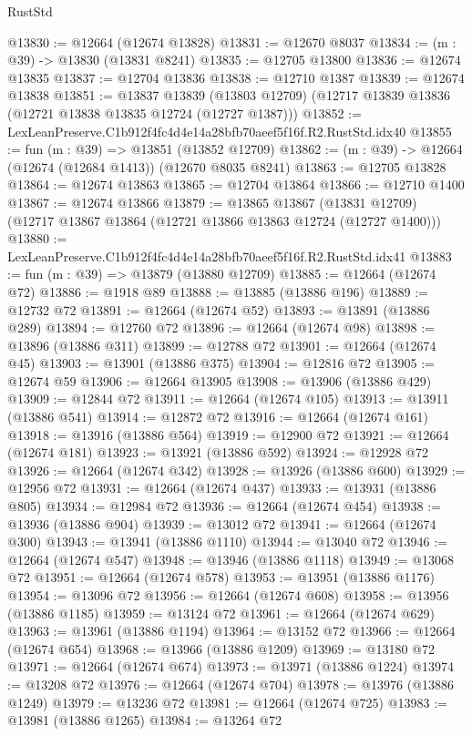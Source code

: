 \begin{lexlean}{RustStd}
\begin{coremodule}
@13830 := @12664 (@12674 @13828)
@13831 := @12670 @8037
@13834 := (m : @39) -> @13830 (@13831 @8241)
@13835 := @12705 @13800
@13836 := @12674 @13835
@13837 := @12704 @13836
@13838 := @12710 @1387
@13839 := @12674 @13838
@13851 := @13837
    @13839
    (@13803 @12709)
    (@12717 @13839 @13836 (@12721 @13838 @13835 @12724 (@12727 @1387)))
@13852 := LexLeanPreserve.C1b912f4fc4d4e14a28bfb70aeef5f16f.R2.RustStd.idx40
@13855 := fun (m : @39) => @13851 (@13852 @12709)
@13862 := (m : @39) -> @12664 (@12674 (@12684 @1413)) (@12670 @8035 @8241)
@13863 := @12705 @13828
@13864 := @12674 @13863
@13865 := @12704 @13864
@13866 := @12710 @1400
@13867 := @12674 @13866
@13879 := @13865
    @13867
    (@13831 @12709)
    (@12717 @13867 @13864 (@12721 @13866 @13863 @12724 (@12727 @1400)))
@13880 := LexLeanPreserve.C1b912f4fc4d4e14a28bfb70aeef5f16f.R2.RustStd.idx41
@13883 := fun (m : @39) => @13879 (@13880 @12709)
@13885 := @12664 (@12674 @72)
@13886 := @1918 @89
@13888 := @13885 (@13886 @196)
@13889 := @12732 @72
@13891 := @12664 (@12674 @52)
@13893 := @13891 (@13886 @289)
@13894 := @12760 @72
@13896 := @12664 (@12674 @98)
@13898 := @13896 (@13886 @311)
@13899 := @12788 @72
@13901 := @12664 (@12674 @45)
@13903 := @13901 (@13886 @375)
@13904 := @12816 @72
@13905 := @12674 @59
@13906 := @12664 @13905
@13908 := @13906 (@13886 @429)
@13909 := @12844 @72
@13911 := @12664 (@12674 @105)
@13913 := @13911 (@13886 @541)
@13914 := @12872 @72
@13916 := @12664 (@12674 @161)
@13918 := @13916 (@13886 @564)
@13919 := @12900 @72
@13921 := @12664 (@12674 @181)
@13923 := @13921 (@13886 @592)
@13924 := @12928 @72
@13926 := @12664 (@12674 @342)
@13928 := @13926 (@13886 @600)
@13929 := @12956 @72
@13931 := @12664 (@12674 @437)
@13933 := @13931 (@13886 @805)
@13934 := @12984 @72
@13936 := @12664 (@12674 @454)
@13938 := @13936 (@13886 @904)
@13939 := @13012 @72
@13941 := @12664 (@12674 @300)
@13943 := @13941 (@13886 @1110)
@13944 := @13040 @72
@13946 := @12664 (@12674 @547)
@13948 := @13946 (@13886 @1118)
@13949 := @13068 @72
@13951 := @12664 (@12674 @578)
@13953 := @13951 (@13886 @1176)
@13954 := @13096 @72
@13956 := @12664 (@12674 @608)
@13958 := @13956 (@13886 @1185)
@13959 := @13124 @72
@13961 := @12664 (@12674 @629)
@13963 := @13961 (@13886 @1194)
@13964 := @13152 @72
@13966 := @12664 (@12674 @654)
@13968 := @13966 (@13886 @1209)
@13969 := @13180 @72
@13971 := @12664 (@12674 @674)
@13973 := @13971 (@13886 @1224)
@13974 := @13208 @72
@13976 := @12664 (@12674 @704)
@13978 := @13976 (@13886 @1249)
@13979 := @13236 @72
@13981 := @12664 (@12674 @725)
@13983 := @13981 (@13886 @1265)
@13984 := @13264 @72

\end{coremodule}
\end{lexlean}
